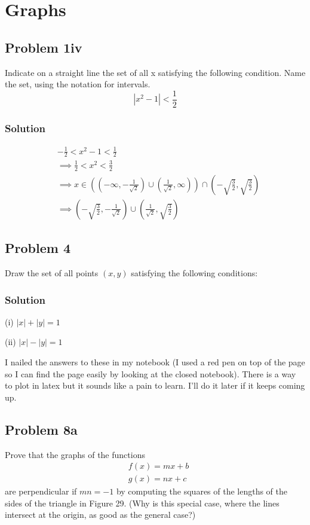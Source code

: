 \section{Graphs}
\subsection*{Problem 1iv}
Indicate on a straight line the set of all x satisfying the following condition. Name the set, using the notation for intervals.
\[|x^2-1|<\frac{1}{2}\]

\subsubsection*{Solution}
\begin{align*}
    &-\frac{1}{2}<x^2-1<\frac{1}{2}\\
    &\implies\frac{1}{2}<x^2<\frac{3}{2}\\
    &\implies x\in((-\infty, -\frac{1}{\sqrt{2}})\cup(\frac{1}{\sqrt{2}}, \infty))\cap(-\sqrt{\frac{3}{2}}, \sqrt{\frac{3}{2}})\\
    &\implies (-\sqrt{\frac{3}{2}}, -\frac{1}{\sqrt{2}})\cup(\frac{1}{\sqrt{2}}, \sqrt{\frac{3}{2}})
\end{align*}

\subsection*{Problem 4}
Draw the set of all points $(x,y)$ satisfying the following conditions:

\subsubsection*{Solution}
(i) $|x|+|y|=1$

(ii) $|x|-|y|=1$

\vs

I nailed the answers to these in my notebook (I used a red pen on top of the page so I can find the page easily by looking at the closed notebook). There is a way to plot in latex but it sounds like a pain to learn. I'll do it later if it keeps coming up.

\subsection*{Problem 8a}
Prove that the graphs of the functions
\begin{align*}
    &f(x)=mx+b\\
    &g(x)=nx+c
\end{align*}
are perpendicular if $mn=-1$ by computing the squares of the lengths of the sides of the triangle in Figure 29. (Why is this special case, where the lines intersect at the origin, as good as the general case?)

